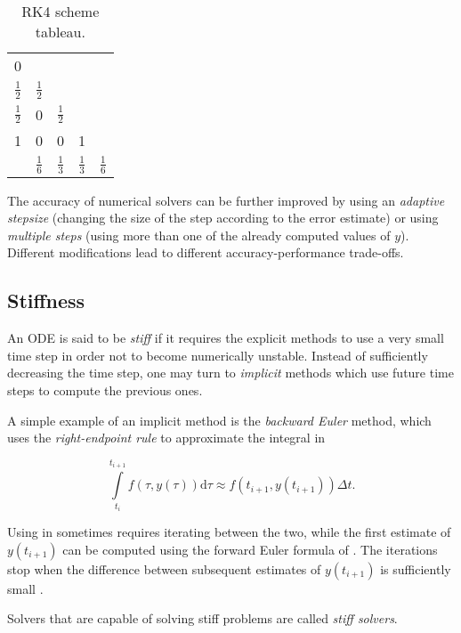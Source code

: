 \begin{table}
  \centering
  \caption{\ac{RK}4 scheme tableau.}
  \bgroup
  \def\arraystretch{1.5}%
  \begin{tabular}{c | c c c c}
    0 & & & &\\
    $\frac{1}{2}$ & $\frac{1}{2}$ & & &\\
    $\frac{1}{2}$ & 0 & $\frac{1}{2}$ & &\\
    1 & 0 & 0 & 1 &\\ \hline
      & $\frac{1}{6}$ & $\frac{1}{3}$ & $\frac{1}{3}$ & $\frac{1}{6}$ \\    
  \end{tabular}
  \egroup
  \label{tab:rk4_tableau}
\end{table}

The accuracy of numerical solvers can be further improved by using an \emph{adaptive stepsize} (changing the size of the step according to the error estimate) or using \emph{multiple steps} (using more than one of the already computed values of $y$). Different modifications lead to different accuracy-performance trade-offs.

\subsection{Stiffness}
\label{subsection:stiffness}

An \ac{ODE} is said to be \emph{stiff} if it requires the explicit methods to use a very small time step in order not to become numerically unstable. Instead of sufficiently decreasing the time step, one may turn to \emph{implicit} methods which use future time steps to compute the previous ones.

A simple example of an implicit method is the \emph{backward Euler} method, which uses the \emph{right-endpoint rule} to approximate the integral in  \cite{Gockenbach2011}

\begin{equation}
    \int \limits_{t_i}^{t_{i+1}} f(\tau, y(\tau)) \mathrm{d} \tau \approx f(t_{i+1}, y(t_{i+1}))\Delta t.
  \label{eq:backward_euler}
\end{equation}

Using  in  sometimes requires iterating between the two, while the first estimate of $y(t_{i+1})$ can be computed using the forward Euler formula of . The iterations stop when the difference between subsequent estimates of $y(t_{i+1})$ is sufficiently small \cite{Yeh2007}.

Solvers that are capable of solving stiff problems are called \emph{stiff solvers}.
